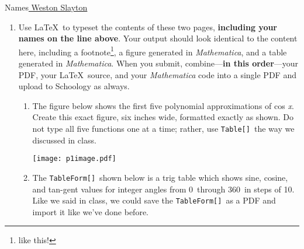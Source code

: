 \documentclass[12pt]{book}
\begin{document}
Names\underline{ Weston Slayton} \\

\begin{enumerate}

\item{ Use \LaTeX\ to typeset the contents of these two pages, \textbf{including your names on the line above}. Your output should look identical to the content here, including a
footnote\footnote{like this!}, a figure generated in \textit{Mathematica}, and a table generated in \textit{Mathematica}. When you submit, combine---\textbf{in this order}---your PDF, your \LaTeX\ source, and your \textit{Mathematica} code into a single PDF and upload to Schoology as always.}

\begin{enumerate}

\item{ The figure below shows the first five polynomial approximations of cos \textit{x}. Create this exact figure, six inches wide, formatted exactly as shown. Do not type all five functions one at a time; rather, use \verb+Table[]+\ the way we discussed in class. }

\begin{center}
\texttt{[image: p1image.pdf]}
\end{center}

\vspace{2.5in}

\item{ The \verb+TableForm[]+\ shown below is a trig table which shows sine, cosine, and tan-gent values for integer angles from 0\degree\ through 360\degree\ in steps of 10\degree. Like we said in class, we could save the \verb+TableForm[]+\ as a PDF and import it like we’ve done before.

}
\end{enumerate}
\end{enumerate}
\end{document}
